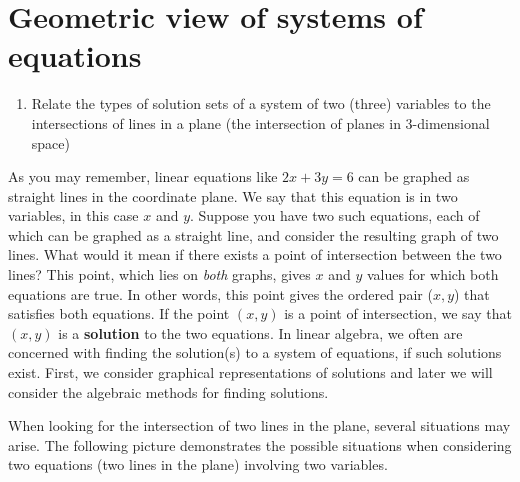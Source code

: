 \section{Geometric view of systems of equations}
\label{sec:systems-geometric}

\begin{outcome}
  \begin{enumerate}
  \item Relate the types of solution sets of a system of two (three)
    variables to the intersections of lines in a plane (the
    intersection of planes in $3$-dimensional space)
  \end{enumerate}
\end{outcome}

As you may remember, linear equations like $2x+3y=6$ can be graphed as
straight lines in the coordinate plane. We say that this equation is
in two variables, in this case $x$ and $y$.  Suppose you have two such
equations, each of which can be graphed as a straight line, and consider
the resulting graph of two lines. What would it mean if there exists a
point of intersection between the two lines? This point, which lies on
{\em both } graphs, gives $x$ and $y$ values for which both
equations are true. In other words, this point gives the ordered pair
($x,y$) that satisfies both equations.  If the point $(x, y
)$ is a point of intersection, we say that $(x, y)$
is a \textbf{solution} to the two equations. In linear algebra, we
often are concerned with finding the solution(s) to a system of
equations, if such solutions exist.  First, we consider graphical
representations of solutions and later we will consider the algebraic
methods for finding solutions.

When looking for the intersection of two lines in the plane, several situations may arise. The following picture demonstrates the possible situations
when considering two equations (two lines in the plane) involving two variables.



